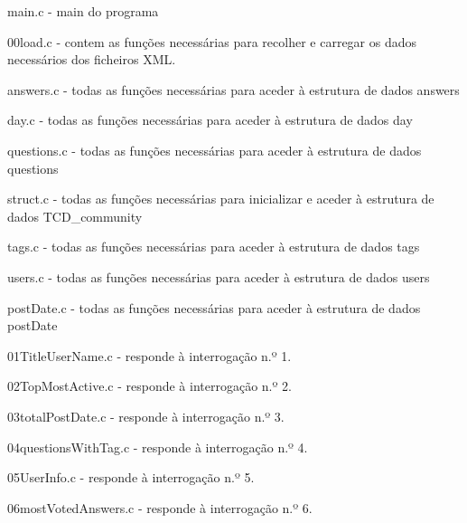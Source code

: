 \documentclass[a4paper]{report}
\begin{document}
\begin{itemize}
\begin{item} main.c - main do programa\end{item}
\begin{item} 00load.c - contem as funções necessárias para recolher e carregar os
dados necessários dos ficheiros XML.\end{item}
\begin{item} answers.c - todas as funções necessárias para aceder à estrutura de
dados answers\end{item}
\begin{item} day.c - todas as funções necessárias para aceder à estrutura de
dados day\end{item}
\begin{item} questions.c - todas as funções necessárias para aceder à estrutura de
dados questions\end{item}
\begin{item} struct.c - todas as funções necessárias para inicializar e aceder à
estrutura de dados TCD\_community\end{item}
\begin{item} tags.c - todas as funções necessárias para aceder à estrutura de
dados tags\end{item}
\begin{item} users.c - todas as funções necessárias para aceder à estrutura de
dados users\end{item}
\begin{item} postDate.c - todas as funções necessárias para aceder à estrutura de
dados postDate\end{item}
\begin{item} 01TitleUserName.c - responde à interrogação n.º 1.\end{item}
\begin{item} 02TopMostActive.c - responde à interrogação n.º 2.\end{item}
\begin{item} 03totalPostDate.c - responde à interrogação n.º 3.\end{item}
\begin{item} 04questionsWithTag.c - responde à interrogação n.º 4.\end{item}
\begin{item} 05UserInfo.c - responde à interrogação n.º 5.\end{item}
\begin{item} 06mostVotedAnswers.c - responde à interrogação n.º 6.\end{item}

\end{itemize}
\end{document}
